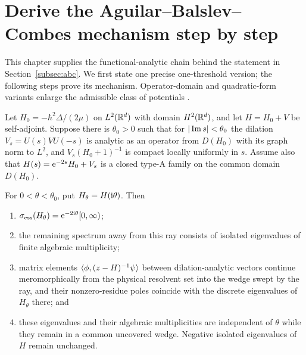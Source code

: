 \section{Derive the Aguilar--Balslev--Combes mechanism step by step}
\label{app:abc-sketch}

This chapter supplies the functional-analytic chain behind the statement in
Section~\ref{subsec:abc}.  We first state one precise one-threshold version;
the following steps prove its mechanism.  Operator-domain and quadratic-form
variants enlarge the admissible class of potentials
\cite{Aguilar:1971ve,Balslev:1971vb,Simon1972BalslevCombes,Simon:73}.

\begin{theorem}
Let $H_0=-\hbar^2\Delta/(2\mu)$ on $L^2(\mathbb{R}^d)$ with domain $H^2(\mathbb{R}^d)$,
and let $H=H_0+V$ be self-adjoint.  Suppose there is $\theta_0>0$ such that
for $|\operatorname{Im} s|<\theta_0$ the dilation
$V_s=U(s)VU(-s)$ is analytic as an operator from $D(H_0)$ with its graph norm
to $L^2$, and $V_s(H_0+1)^{-1}$ is compact locally uniformly in $s$.  Assume
also that $H(s)=\mathrm{e}^{-2s}H_0+V_s$ is a closed type-A family on the common
domain $D(H_0)$.

For $0<\theta<\theta_0$, put $H_\theta=H(\mathrm{i}\theta)$.  Then
\begin{enumerate}[label=(\roman*)]
  \item $\sigma_{\mathrm{ess}}(H_\theta)
  =\mathrm{e}^{-2\mathrm{i}\theta}[0,\infty)$;
  \item the remaining spectrum away from this ray consists of isolated
  eigenvalues of finite algebraic multiplicity;
  \item matrix elements $\langle \phi,(z-H)^{-1}\psi\rangle$ between
  dilation-analytic vectors continue meromorphically from the physical
  resolvent set into the wedge swept by the ray, and their nonzero-residue
  poles coincide with the discrete eigenvalues of $H_\theta$ there; and
  \item these eigenvalues and their algebraic multiplicities are independent
  of $\theta$ while they remain in a common uncovered wedge.  Negative
  isolated eigenvalues of $H$ remain unchanged.
\end{enumerate}
\label{thm:abc-type-A}
\end{theorem}

